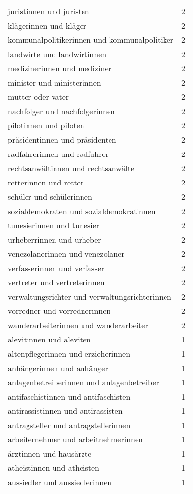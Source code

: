 \begin{tabular}{ll}
juristinnen und juristen & 2\\
klägerinnen und kläger & 2\\
kommunalpolitikerinnen und kommunalpolitiker & 2\\
landwirte und landwirtinnen & 2\\
medizinerinnen und mediziner & 2\\
minister und ministerinnen & 2\\
mutter oder vater & 2\\
nachfolger und nachfolgerinnen & 2\\
pilotinnen und piloten & 2\\
präsidentinnen und präsidenten & 2\\
radfahrerinnen und radfahrer & 2\\
rechtsanwältinnen und rechtsanwälte & 2\\
retterinnen und retter & 2\\
schüler und schülerinnen & 2\\
sozialdemokraten und sozialdemokratinnen & 2\\
tunesierinnen und tunesier & 2\\
urheberrinnen und urheber & 2\\
venezolanerinnen und venezolaner & 2\\
verfasserinnen und verfasser & 2\\
vertreter und vertreterinnen & 2\\
verwaltungsrichter und verwaltungsrichterinnen & 2\\
vorredner und vorrednerinnen & 2\\
wanderarbeiterinnen und wanderarbeiter & 2\\
alevitinnen und aleviten & 1\\
altenpflegerinnen und erzieherinnen & 1\\
anhängerinnen und anhänger & 1\\
anlagenbetreiberinnen und anlagenbetreiber & 1\\
antifaschistinnen und antifaschisten & 1\\
antirassistinnen und antirassisten & 1\\
antragsteller und antragstellerinnen & 1\\
arbeiternehmer und arbeitnehmerinnen & 1\\
ärztinnen und hausärzte & 1\\
atheistinnen und atheisten & 1\\
aussiedler und aussiedlerinnen & 1\\

\end{tabular}
